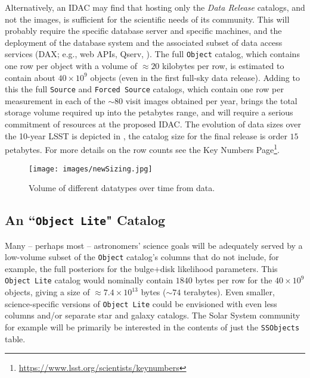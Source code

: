 Alternatively, an \gls{IDAC} may find that hosting only the {\it Data Release} catalogs, and not the images, is sufficient for the scientific needs of its community. This will probably require the specific \RO database server  and specific machines, and the deployment of the database system and the associated subset of data access services (\gls{DAX}; e.g., web APIs, \gls{Qserv}, ). The full {\tt Object} catalog, which contains one row per object with a volume of $\approx 20$ kilobytes per row, is estimated to contain about $40 \times 10^9$ objects (even in the first full-sky data release). Adding to this the full {\tt Source} and {\tt Forced Source} catalogs, which contain one row per measurement in each of the $\sim80$ visit images obtained per year, brings the total storage volume required up into the petabytes range, and will require a serious commitment of resources at the proposed \gls{IDAC}. The evolution of data sizes over the 10-year \gls{LSST} is depicted in , the catalog size for the final release is order $15$ petabytes. For more details on the row counts see the Key Numbers Page\footnote{\url{https://www.lsst.org/scientists/keynumbers}}.

\begin{figure}
\begin{center}
\texttt{[image: images/newSizing.jpg]}
\caption{ Volume of different datatypes  over time from  data. \label{fig:catvol}}
\end{center}
\end{figure}

\subsection{An ``{\tt \gls{Object} Lite}" Catalog}\label{sec:lite}

Many -- perhaps most -- astronomers' science goals will be adequately served by a low-volume subset of the {\tt \gls{Object}} catalog's columns that do not include, for example, the full posteriors for the bulge+disk likelihood parameters.
This {\tt \gls{Object} Lite} catalog would nominally contain $1840$ bytes per row for the $40 \times 10^{9}$ objects, giving a size of $\approx 7.4 \times 10^{13}$ bytes ($\sim74$ terabytes).
Even smaller, science-specific versions of {\tt \gls{Object} Lite} could be envisioned with even less columns and/or separate star and galaxy catalogs.
The Solar System community for example will be primarily be interested in the contents of  just the  {\tt SSObjects} table.

